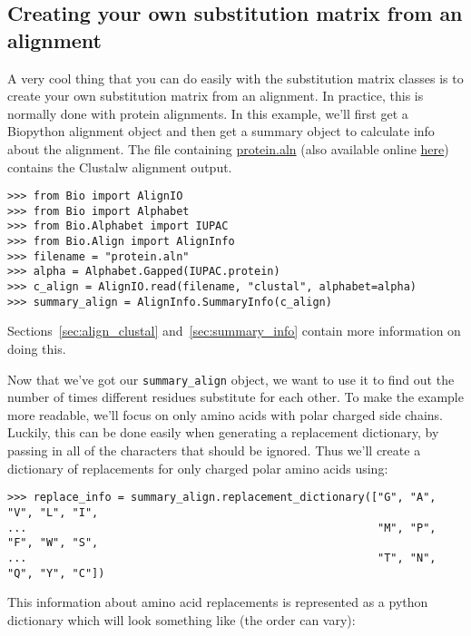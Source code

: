 \subsection{Creating your own substitution matrix from an alignment}
\label{sec:subs_mat_ex}

A very cool thing that you can do easily with the substitution matrix
classes is to create your own substitution matrix from an
alignment. In practice, this is normally done with protein
alignments. In this example, we'll first get a Biopython alignment
object and then get a summary object to calculate info about the
alignment. The file containing \href{examples/protein.aln}{protein.aln}
(also available online
\href{https://raw.githubusercontent.com/biopython/biopython/master/Doc/examples/protein.aln}{here})
contains the Clustalw alignment output.

\begin{verbatim}
>>> from Bio import AlignIO
>>> from Bio import Alphabet
>>> from Bio.Alphabet import IUPAC
>>> from Bio.Align import AlignInfo
>>> filename = "protein.aln"
>>> alpha = Alphabet.Gapped(IUPAC.protein)
>>> c_align = AlignIO.read(filename, "clustal", alphabet=alpha)
>>> summary_align = AlignInfo.SummaryInfo(c_align)
\end{verbatim}

Sections~\ref{sec:align_clustal} and~\ref{sec:summary_info} contain
more information on doing this.

Now that we've got our \verb|summary_align| object, we want to use it
to find out the number of times different residues substitute for each
other. To make the example more readable, we'll focus on only amino
acids with polar charged side chains. Luckily, this can be done easily
when generating a replacement dictionary, by passing in all of the
characters that should be ignored. Thus we'll create a dictionary of
replacements for only charged polar amino acids using:

\begin{verbatim}
>>> replace_info = summary_align.replacement_dictionary(["G", "A", "V", "L", "I",
...                                                      "M", "P", "F", "W", "S",
...                                                      "T", "N", "Q", "Y", "C"])
\end{verbatim}

This information about amino acid replacements is represented as a
python dictionary which will look something like (the order can vary):

